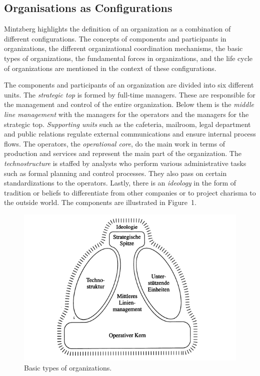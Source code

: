 \documentclass[a4paper,12pt]{article}
\begin{document}
\subsection{Organisations as Configurations}

Mintzberg highlights the definition of an organization as a combination of
different configurations. The concepts of components and participants in
organizations, the different organizational coordination mechanisms, the basic
types of organizations, the fundamental forces in organizations, and the life
cycle of organizations are mentioned in the context of these configurations.

The components and participants of an organization are divided into six
different units. The \emph{strategic top} is formed by full-time managers.
These are responsible for the management and control of the entire
organization.  Below them is the \emph{middle line management} with the
managers for the operators and the managers for the strategic top.
\emph{Supporting units} such as the cafeteria, mailroom, legal department and
public relations regulate external communications and ensure internal process
flows. The operators, the \emph{operational core}, do the main work in terms
of production and services and represent the main part of the organization.
The \emph{technostructure} is staffed by analysts who perform various
administrative tasks such as formal planning and control processes. They also
pass on certain standardizations to the operators. Lastly, there is an
\emph{ideology} in the form of tradition or beliefs to differentiate from
other companies or to project charisma to the outside world. The components
are illustrated in Figure~1.

\begin{figure}[ht]
\centering
\includegraphics[scale=0.6]{basic_types.png}
\caption{Basic types of organizations. \cite[p. 110]{Mintzberg}}
\label{fig:basic_types}
\end{figure}
\end{document}
